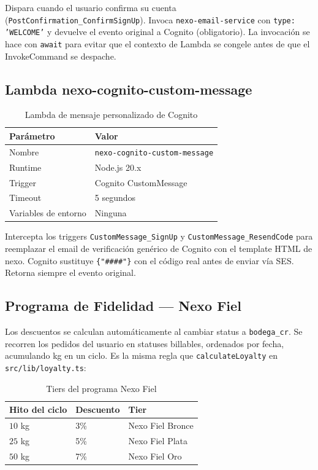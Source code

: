 \documentclass[12pt,a4paper]{article}
\begin{document}
Dispara cuando el usuario confirma su cuenta (\texttt{PostConfirmation\_ConfirmSignUp}).
Invoca \texttt{nexo-email-service} con \texttt{type: 'WELCOME'} y devuelve el evento
original a Cognito (obligatorio). La invocación se hace con \texttt{await} para evitar
que el contexto de Lambda se congele antes de que el InvokeCommand se despache.

\subsection{Lambda nexo-cognito-custom-message}

\begin{table}[H]
\centering
\begin{tabular}{@{}ll@{}}
\toprule
\textbf{Parámetro} & \textbf{Valor} \\
\midrule
Nombre & \texttt{nexo-cognito-custom-message} \\
Runtime & Node.js 20.x \\
Trigger & Cognito CustomMessage \\
Timeout & 5 segundos \\
Variables de entorno & Ninguna \\
\bottomrule
\end{tabular}
\caption{Lambda de mensaje personalizado de Cognito}
\end{table}

Intercepta los triggers \texttt{CustomMessage\_SignUp} y \texttt{CustomMessage\_ResendCode}
para reemplazar el email de verificación genérico de Cognito con el template HTML
de nexo. Cognito sustituye \texttt{\{"\#\#\#\#"\}} con el código real antes de enviar
vía SES. Retorna siempre el evento original.

\subsection{Programa de Fidelidad --- Nexo Fiel}

Los descuentos se calculan automáticamente al cambiar status a \texttt{bodega\_cr}.
Se recorren los pedidos del usuario en statuses billables, ordenados por fecha, acumulando kg
en un ciclo. Es la misma regla que \texttt{calculateLoyalty} en \texttt{src/lib/loyalty.ts}:

\begin{table}[H]
\centering
\begin{tabular}{@{}lll@{}}
\toprule
\textbf{Hito del ciclo} & \textbf{Descuento} & \textbf{Tier} \\
\midrule
$10$ kg & 3\% & Nexo Fiel Bronce \\
$25$ kg & 5\% & Nexo Fiel Plata \\
$50$ kg & 7\% & Nexo Fiel Oro \\
\bottomrule
\end{tabular}
\caption{Tiers del programa Nexo Fiel}
\end{table}
\end{document}
